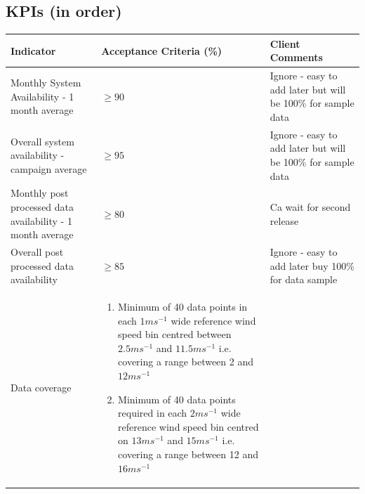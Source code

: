 \documentclass{article}
\begin{document}
\begin{multicols}{2}
    \subsection{KPIs (in order)}
    \begin{tabularx}{\linewidth}{XXX}
        Indicator & Acceptance Criteria (\%) & Client Comments \\
        \toprule
        Monthly System Availability - 1 month average & $\geq 90$ & Ignore - easy to add later but will be 100\% for sample data \\
        Overall system availability - campaign average & $\geq 95$ & Ignore - easy to add later but will be 100\% for sample data \\
        Monthly post processed data availability - 1 month average & $\geq 80$ & Ca wait for second release \\
        Overall post processed data availability & $ \geq 85$ & Ignore - easy to add later buy 100\% for data sample \\
        Data coverage & 
        \begin{enumerate}
            \item Minimum of 40 data points in each $1ms^{-1}$ wide reference wind speed bin centred between $2.5ms^{-1}$ and $11.5ms^{-1}$ i.e. covering a range between 2 and $12ms^{-1}$
            \item Minimum of 40 data points required in each $2ms^{-1}$ wide reference wind speed bin centred on $13ms^{-1}$ and $15ms^{-1}$ i.e. covering a range between 12 and $16ms^{-1}$
        \end{enumerate}
    \end{tabularx}
    \vfill\null\columnbreak{}
    \vfill\null{}
\end{multicols}
\end{document}
